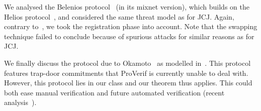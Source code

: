 


We analysed the Belenios protocol~\cite{cortier2014election} (in its
mixnet version),
which builds on the Helios protocol~\cite{adida2008helios}, and considered the same threat model as for JCJ.
Again, contrary to~\cite{vote-ESO16}, we took the registration phase into account. Note that the swapping technique failed
to conclude because of spurious attacks for similar reasons as for JCJ.


We finally discuss the protocol due to Okamoto~\cite{okamoto1996electronic} as modelled in~\cite{DKR-jcs09}.
This protocol features trap-door commitments that ProVerif is currently
unable to deal with. %
However, this protocol lies in
our class and our theorem thus applies. This 
could both ease manual verification and future automated verification
(\eg recent analysis~\cite{dreier2017beyond}).


